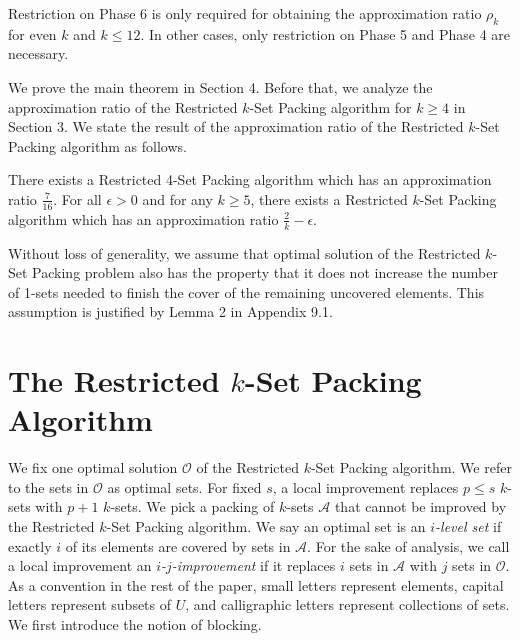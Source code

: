 \documentclass[runningheads,a4paper]{llncs}
\numberwithin{equation}{section}
\begin{document}
\begin{remark}
Restriction on Phase 6 is only required for obtaining the approximation ratio $\rho_k$ for even $k$ and $k\leq 12$. In other cases, only restriction on Phase 5 and Phase 4 are necessary.
\end{remark}



We prove the main theorem in Section 4. Before that, we analyze the approximation ratio of the Restricted $k$-Set Packing algorithm for $k\geq 4$ in Section 3. We state the result of the approximation ratio of the Restricted $k$-Set Packing algorithm as follows.

\begin{theorem}
There exists a Restricted 4-Set Packing algorithm which has an approximation ratio $\frac{7}{16}$. For all $\epsilon>0$ and for any $k\geq 5$, there exists a Restricted $k$-Set Packing algorithm which has an approximation ratio $\frac{2}{k}-\epsilon$.
\end{theorem}

\begin{remark}
Without loss of generality, we assume that optimal solution of the Restricted $k$-Set Packing problem also has the property that it does not increase the number of 1-sets needed to finish the cover of the remaining uncovered elements. This assumption is justified by Lemma 2 in Appendix 9.1.
\end{remark}

\section{The Restricted $k$-Set Packing Algorithm}

We fix one optimal solution $\mathscr{O}$ of the Restricted $k$-Set Packing algorithm. We refer to the sets in $\mathscr{O}$ as optimal sets. For fixed $s$, a local improvement replaces $p\leq s$ $k$-sets with $p+1$ $k$-sets. We pick a packing of $k$-sets $\mathscr{A}$ that cannot be improved by the Restricted $k$-Set Packing algorithm. We say an optimal set is an \emph{$i$-level set} if exactly $i$ of its elements are covered by sets in $\mathscr{A}$. For the sake of analysis, we call a local improvement an \emph{$i$-$j$-improvement} if it replaces $i$ sets in $\mathscr{A}$ with $j$ sets in $\mathscr{O}$. As a convention in the rest of the paper, small letters represent elements, capital letters represent subsets of $U$, and calligraphic letters represent collections of sets. We first introduce the notion of blocking.
\end{document}
